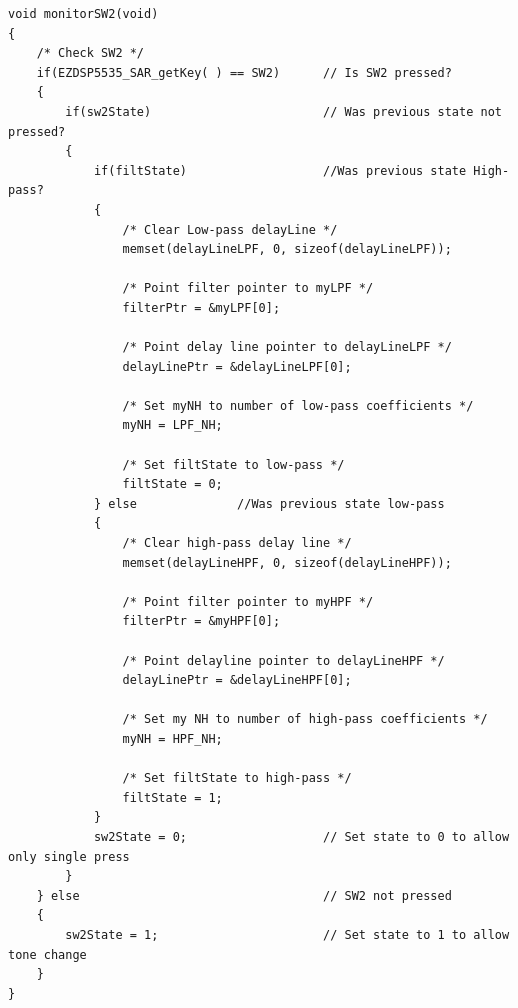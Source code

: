 \documentclass[11pt,pdftex,portrait,letterpaper]{article}
\begin{document}
\begin{lstlisting}[caption={audioProcessing.c}, label=l:program2]
void monitorSW2(void)
{
	/* Check SW2 */
	if(EZDSP5535_SAR_getKey( ) == SW2) 		// Is SW2 pressed?
	{
		if(sw2State)          				// Was previous state not pressed?
		{
			if(filtState)					//Was previous state High-pass?
			{
				/* Clear Low-pass delayLine */
				memset(delayLineLPF, 0, sizeof(delayLineLPF));

				/* Point filter pointer to myLPF */
				filterPtr = &myLPF[0];

				/* Point delay line pointer to delayLineLPF */
				delayLinePtr = &delayLineLPF[0];

				/* Set myNH to number of low-pass coefficients */
				myNH = LPF_NH;

				/* Set filtState to low-pass */
				filtState = 0;
			} else				//Was previous state low-pass
			{
				/* Clear high-pass delay line */
				memset(delayLineHPF, 0, sizeof(delayLineHPF));

				/* Point filter pointer to myHPF */
				filterPtr = &myHPF[0];

				/* Point delayline pointer to delayLineHPF */
				delayLinePtr = &delayLineHPF[0];

				/* Set my NH to number of high-pass coefficients */
				myNH = HPF_NH;

				/* Set filtState to high-pass */
				filtState = 1;
			}
			sw2State = 0;     				// Set state to 0 to allow only single press
		}
	} else                      			// SW2 not pressed
	{
		sw2State = 1;         				// Set state to 1 to allow tone change
	}
}
\end{lstlisting}
\pagebreak
\end{document}
